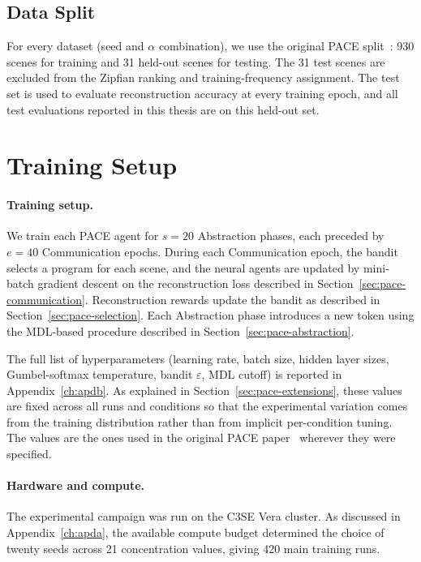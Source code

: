 \subsection{Data Split}
\label{sec:framework-data-split}

For every dataset (seed and $\alpha$ combination), we use the original PACE split~\cite{thomas_pace_2025}: 930 scenes for training and 31 held-out scenes for testing. The 31 test scenes are excluded from the Zipfian ranking and training-frequency assignment. The test set is used to evaluate reconstruction accuracy at every training epoch, and all test evaluations reported in this thesis are on this held-out set.

\section{Training Setup}
\label{sec:framework-training-setup}

\paragraph{Training setup.}
We train each PACE agent for $s = 20$ Abstraction phases, each preceded by $e = 40$ Communication epochs. During each Communication epoch, the bandit selects a program for each scene, and the neural agents are updated by mini-batch gradient descent on the reconstruction loss described in Section~\ref{sec:pace-communication}. Reconstruction rewards update the bandit as described in Section~\ref{sec:pace-selection}. Each Abstraction phase introduces a new token using the MDL-based procedure described in Section~\ref{sec:pace-abstraction}.

The full list of hyperparameters (learning rate, batch size, hidden layer sizes, Gumbel-softmax temperature, bandit $\varepsilon$, MDL cutoff) is reported in Appendix~\ref{ch:apdb}. As explained in Section~\ref{sec:pace-extensions}, these values are fixed across all runs and conditions so that the experimental variation comes from the training distribution rather than from implicit per-condition tuning. The values are the ones used in the original PACE paper~\cite{thomas_pace_2025} wherever they were specified.

\paragraph{Hardware and compute.}
The experimental campaign was run on the C3SE Vera cluster. As discussed in Appendix~\ref{ch:apda}, the available compute budget determined the choice of twenty seeds across 21 concentration values, giving 420 main training runs.

